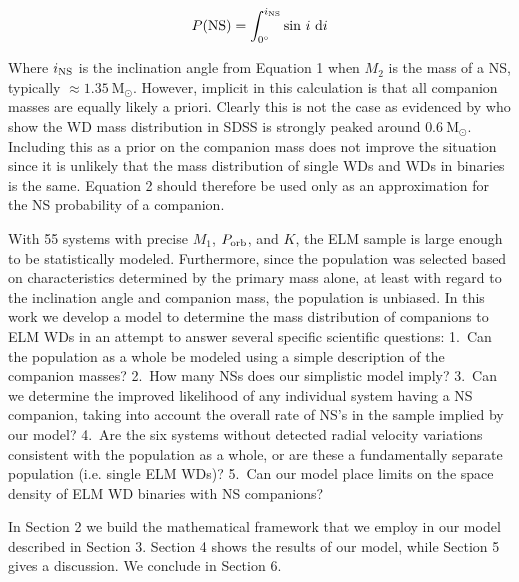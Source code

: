 \documentclass[letterpaper,12pt,preprint]{aastex}
\newcommand{\Msun}{\mathrm{M}_\odot}
\begin{document}
\begin{equation}
P({\rm NS}) = \int_{0^{\circ}}^{i_{\rm NS}} {\rm sin}\ i\ {\rm d}i
\end{equation}

Where $i_{\rm NS}$ is the inclination angle from Equation 1 when $M_2$ is the mass of a NS, typically $\approx1.35~\Msun$. However, implicit in this calculation is that all companion masses are equally likely a priori. Clearly this is not the case as evidenced by \citep{kleinman13} who show the WD mass distribution in SDSS is strongly peaked around $0.6~\Msun$. Including this as a prior on the companion mass does not improve the situation since it is unlikely that the mass distribution of single WDs and WDs in binaries is the same. Equation 2 should therefore be used only as an approximation for the NS probability of a companion.


With 55 systems with precise $M_1$, $P_{\rm orb}$, and $K$, the ELM sample is large enough to be statistically modeled. Furthermore, since the population was selected based on characteristics determined by the primary mass alone, at least with regard to the inclination angle and companion mass, the population is unbiased. In this work we develop a model to determine the mass distribution of companions to ELM WDs in an attempt to answer several specific scientific questions: 1.\ Can the population as a whole be modeled using a simple description of the companion masses? 2.\ How many NSs does our simplistic model imply? 3.\ Can we determine the improved likelihood of any individual system having a NS companion, taking into account the overall rate of NS's in the sample implied by our model? 4.\ Are the six systems without detected radial velocity variations consistent with the population as a whole, or are these a fundamentally separate population (i.e. single ELM WDs)? 5.\ Can our model place limits on the space density of ELM WD binaries with NS companions? 


In Section 2 we build the mathematical framework that we employ in our model described in Section 3. Section 4 shows the results of our model, while Section 5 gives a discussion. We conclude in Section 6.
\end{document}

